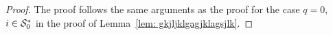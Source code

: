 \begin{proof}
	The proof follows the same arguments as the proof for the case \(q=0\), \(i\in\mathcal{S}_0^*\) in the proof of Lemma~\ref{lem: gkjljklgagjklagsjlk}.

	
	

\end{proof}
